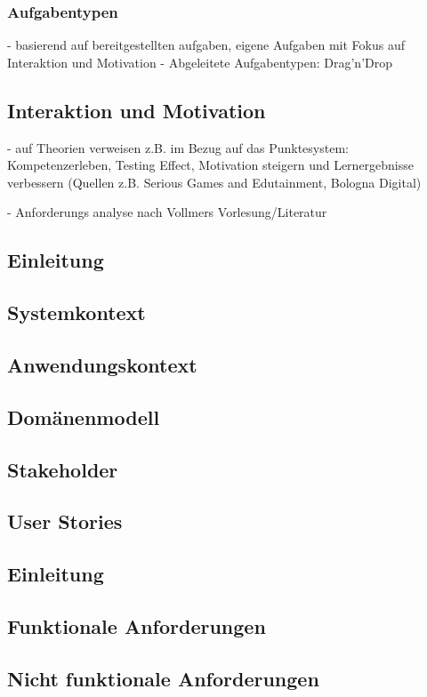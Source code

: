 \subsubsection{Aufgabentypen}
- basierend auf bereitgestellten aufgaben, eigene Aufgaben mit Fokus auf Interaktion und Motivation
- Abgeleitete Aufgabentypen: Drag'n'Drop

\subsection{Interaktion und Motivation}
- auf Theorien verweisen z.B. im Bezug auf das Punktesystem: Kompetenzerleben, Testing Effect, Motivation steigern und Lernergebnisse verbessern (Quellen z.B. Serious Games and Edutainment, Bologna Digital)

- Anforderungs analyse nach Vollmers Vorlesung/Literatur
\subsection{Einleitung}
\subsection{Systemkontext}
\subsection{Anwendungskontext}
\subsection{Domänenmodell}
\subsection{Stakeholder}
\subsection{User Stories}

\subsection{Einleitung}
\subsection{Funktionale Anforderungen}
\subsection{Nicht funktionale Anforderungen}
